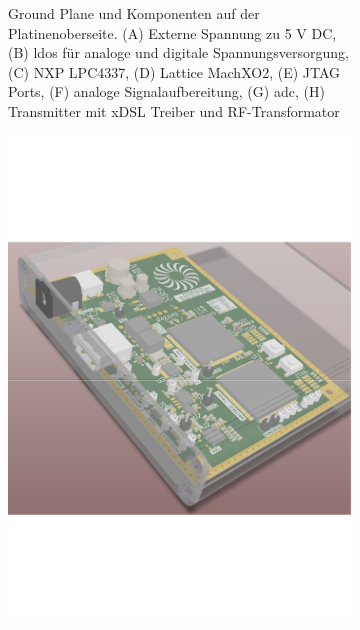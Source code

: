 \begin{figure}[h!]
\begin{subfigure}[t]{0.46\textwidth}
\begin{annotatedFigure}
\end{annotatedFigure}
    \caption{Ground Plane und Komponenten auf der Platinenoberseite. (A) Externe Spannung zu 5 V DC, (B) \ac{ldo}s für analoge und digitale Spannungsversorgung, (C) NXP LPC4337, (D) Lattice MachXO2, (E) JTAG Ports, (F) analoge Signalaufbereitung, (G) \ac{adc}, (H) Transmitter mit xDSL Treiber und RF-Transformator}
    \label{fig:system_layout}
    \end{subfigure}%
    \hfil
    \begin{subfigure}[t]{0.46\textwidth}
    \centering
    \begin{annotatedFigure}
	{\includegraphics[page=5,width=1\textwidth, trim= 0mm 0mm 0mm 0mm, clip=true]{images/pcb/Job2.PDF}}

\end{annotatedFigure}
\end{subfigure}
\end{figure}

